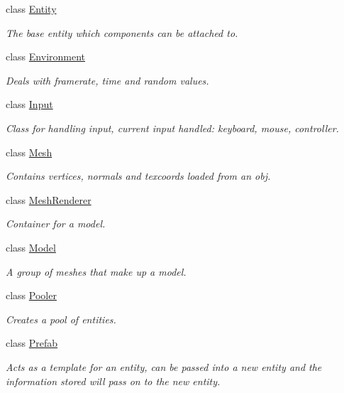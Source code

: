 \begin{DoxyCompactItemize}
class \hyperlink{classfrontier_1_1_entity}{Entity}
\begin{DoxyCompactList}\small\item\em The base entity which components can be attached to. \end{DoxyCompactList}\item 
class \hyperlink{classfrontier_1_1_environment}{Environment}
\begin{DoxyCompactList}\small\item\em Deals with framerate, time and random values. \end{DoxyCompactList}\item 
class \hyperlink{classfrontier_1_1_input}{Input}
\begin{DoxyCompactList}\small\item\em Class for handling input, current input handled\+: keyboard, mouse, controller. \end{DoxyCompactList}\item 
class \hyperlink{classfrontier_1_1_mesh}{Mesh}
\begin{DoxyCompactList}\small\item\em Contains vertices, normals and texcoords loaded from an obj. \end{DoxyCompactList}\item 
class \hyperlink{classfrontier_1_1_mesh_renderer}{Mesh\+Renderer}
\begin{DoxyCompactList}\small\item\em Container for a model. \end{DoxyCompactList}\item 
class \hyperlink{classfrontier_1_1_model}{Model}
\begin{DoxyCompactList}\small\item\em A group of meshes that make up a model. \end{DoxyCompactList}\item 
class \hyperlink{classfrontier_1_1_pooler}{Pooler}
\begin{DoxyCompactList}\small\item\em Creates a pool of entities. \end{DoxyCompactList}\item 
class \hyperlink{classfrontier_1_1_prefab}{Prefab}
\begin{DoxyCompactList}\small\item\em Acts as a template for an entity, can be passed into a new entity and the information stored will pass on to the new entity. \end{DoxyCompactList}\item 

\end{DoxyCompactItemize}
